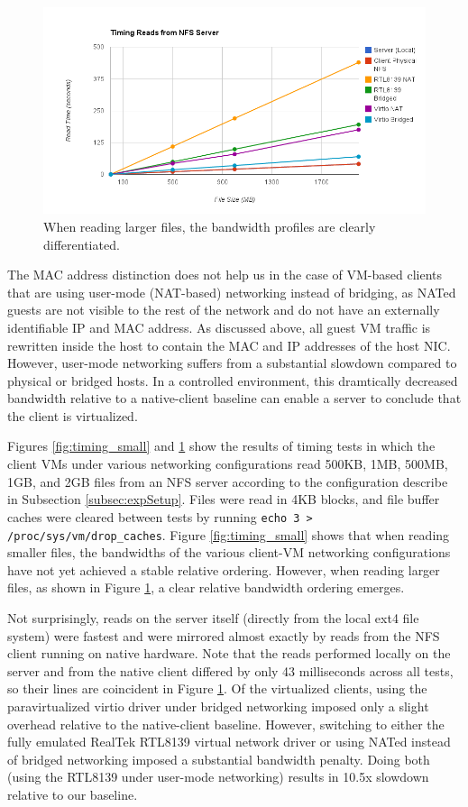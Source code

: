 \documentclass[11pt,pdftex,twocolumn]{article}
\begin{document}
\begin{figure}[!ht]
	\center
		\includegraphics[scale=0.3]{timing_large.png}
	\caption{When reading larger files, the bandwidth profiles are clearly differentiated.}
	\label{fig:timing_large}
\end{figure}

The MAC address distinction does not help us in the case of VM-based clients that are using user-mode (NAT-based) networking instead of bridging, as NATed guests are not visible to the rest of the network and do not have an externally identifiable IP and MAC address. As discussed above, all guest VM traffic is rewritten inside the host to contain the MAC and IP addresses of the host NIC. However, user-mode networking suffers from a substantial slowdown compared to physical or bridged hosts. In a controlled environment, this dramtically decreased bandwidth relative to a native-client baseline can enable a server to conclude that the client is virtualized. 

Figures \ref{fig:timing_small} and \ref{fig:timing_large} show the results of timing tests in which the client VMs under various networking configurations read 500KB, 1MB, 500MB, 1GB, and 2GB files from an NFS server according to the configuration describe in Subsection \ref{subsec:expSetup}. Files were read in 4KB blocks, and file buffer caches were cleared between tests by running \texttt{echo 3 > /proc/sys/vm/drop\_caches}. Figure \ref{fig:timing_small} shows that when reading smaller files, the bandwidths of the various client-VM networking configurations have not yet achieved a stable relative ordering. However, when reading larger files, as shown in Figure \ref{fig:timing_large}, a clear relative bandwidth ordering emerges.

Not surprisingly, reads on the server itself (directly from the local ext4 file system) were fastest and were mirrored almost exactly by reads from the NFS client running on native hardware. Note that the reads performed locally on the server and from the native client differed by only 43 milliseconds across all tests, so their lines are coincident in Figure \ref{fig:timing_large}. Of the virtualized clients, using the paravirtualized virtio driver under bridged networking imposed only a slight overhead relative to the native-client baseline. However, switching to either the fully emulated RealTek RTL8139 virtual network driver or using NATed instead of bridged networking imposed a substantial bandwidth penalty. Doing both (using the RTL8139 under user-mode networking) results in 10.5x slowdown relative to our baseline. 
\end{document}
